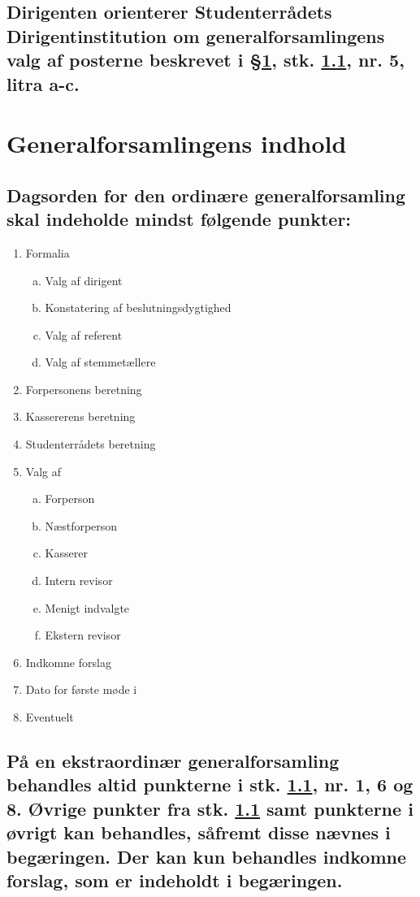 \documentclass[10pt]{article}
\newcommand{\fagr}{\text{Fagrådet Sigma}}
\begin{document}
\subsection{Dirigenten orienterer Studenterrådets Dirigentinstitution om generalforsamlingens valg af posterne beskrevet i §\ref{gfi}, stk. \ref{gfi:dagsorden}, nr. 5, litra a-c.}\label{gf:orienterer}

\section{Generalforsamlingens indhold}\label{gfi}

\subsection{Dagsorden for den ordinære generalforsamling skal indeholde mindst følgende punkter:}\label{gfi:dagsorden}

\begin{enumerate}[1), nosep]
\item Formalia

	\begin{enumerate}[a., nosep]
	\item Valg af dirigent
	\item Konstatering af beslutningsdygtighed
	\item Valg af referent
	\item Valg af stemmetællere
	\end{enumerate}
\item Forpersonens beretning
\item Kassererens beretning
\item Studenterrådets beretning
\item Valg af
	\begin{enumerate}[a., nosep]
	\item Forperson
	\item Næstforperson
	\item Kasserer
	\item Intern revisor
	\item Menigt indvalgte
	\item Ekstern revisor
	\end{enumerate}
\item Indkomne forslag
\item Dato for første møde i \fagr{}
\item Eventuelt
\end{enumerate}

\subsection{På en ekstraordinær generalforsamling behandles altid punkterne i stk. \ref{gfi:dagsorden}, nr. 1, 6 og 8. Øvrige punkter fra stk. \ref{gfi:dagsorden} samt punkterne i øvrigt kan behandles, såfremt disse nævnes i begæringen. Der kan kun behandles indkomne forslag, som er indeholdt i begæringen.}\label{gfi:ekstra}
\end{document}
